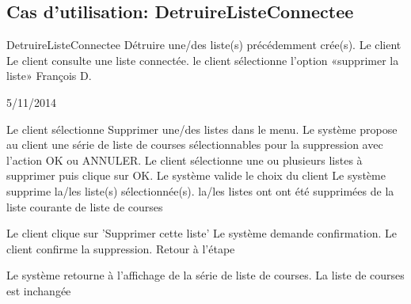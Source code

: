 \subsection{Cas d'utilisation: DetruireListeConnectee}

\startCU
\nom DetruireListeConnectee
\but Détruire une/des liste(s) précédemment crée(s).
\acteur Le client
\precondition Le client consulte une liste connectée.
\declenchement le client sélectionne l'option «supprimer la liste»
\auteur François D.
\date 05/11/2014

\nominal %
\startnominal
\etape[DEJALISTE] Le client sélectionne Supprimer une/des listes dans le menu.
\etape Le système propose au client une série de liste de courses sélectionnables pour la suppression avec l'action OK ou ANNULER.
\etape[ANNULATION] Le client sélectionne une ou plusieurs listes à supprimer puis clique sur OK.
\etape[VALIDATION] Le système valide le choix du client
\etape[AFFICHAGE] Le système supprime la/les liste(s) sélectionnée(s).
\stopnominal
\postcondition la/les listes ont ont été supprimées de la liste courante de liste de courses

\alternatifs 
\startalternatif[DEJALISTE] 
  \etape Le client clique sur 'Supprimer cette liste'
  \etape Le système demande confirmation.
  \etape Le client confirme la suppression.
  \etape Retour à l'étape \in[VALIDATION]
\stopcondition
\stopalternatif

\exception 
\startalternatif[ANNULATION] 
  \etape Le système retourne à l'affichage de la série de liste de courses.
\stopcondition
\postcondition La liste de courses est inchangée
\stopalternatif
\stopCU
